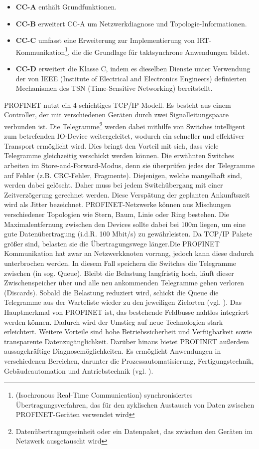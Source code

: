\begin{itemize}
\item \textbf{CC-A} enthält Grundfunktionen.
\item \textbf{CC-B} erweitert CC-A um Netzwerkdiagnose und Topologie-Informationen.
\item \textbf{CC-C} umfasst eine Erweiterung zur Implementierung von IRT-Kommunikation\footnote{(Isochronous Real-Time Communication) synchronisiertes Übertragungsverfahren, das für den zyklischen Austausch von Daten zwischen PROFINET-Geräten verwendet wird}, die die Grundlage für taktsynchrone Anwendungen bildet.
\item \textbf{CC-D} erweitert die Klasse C, indem es dieselben Dienste unter Verwendung der von IEEE (Institute of Electrical and Electronics Engineers) definierten Mechanismen des TSN (Time-Sensitive Networking) bereitstellt.
\end{itemize} PROFINET nutzt ein 4-schichtiges TCP/IP-Modell. 
Es besteht aus einem Controller, der mit verschiedenen Geräten durch zwei Signalleitungspaare verbunden ist. Die Telegramme\footnote{Datenübertragungseinheit oder ein Datenpaket, das zwischen den Geräten im Netzwerk ausgetauscht wird} werden dabei mithilfe von Switches intelligent zum betrefenden IO-Device weitergeleitet, wodurch ein schneller und effektiver Transport ermöglicht wird. Dies bringt den Vorteil mit sich, dass viele Telegramme gleichzeitig verschickt werden können. Die erwähnten Switches arbeiten im Store-and-Forward-Modus, denn sie überprüfen jedes der Telegramme auf Fehler (z.B. CRC-Fehler, Fragmente). Diejenigen, welche mangelhaft sind, werden dabei gelöscht. Daher muss bei jedem Switchübergang mit einer Zeitverzögerung gerechnet werden. Diese Verspätung der geplanten Ankunftszeit wird als Jitter bezeichnet. PROFINET-Netzwerke können aus Mischungen verschiedener Topologien wie Stern, Baum, Linie oder Ring bestehen. Die Maximalentfernung zwischen den Devices sollte dabei bei 100m liegen, um eine gute Datenübertragung (i.d.R. 100 Mbit/s) zu gewährleisten. Da TCP/IP Pakete größer sind, belasten sie die Übertragungswege länger.\clearpage \noindent Die PROFINET Kommunikation hat zwar an Netzwerkknoten vorrang, jedoch kann diese dadurch unterbrochen werden. In diesem Fall speichern die Switches die Telegramme zwischen (in sog. Queue). Bleibt die Belastung langfristig hoch, läuft dieser Zwischenspeicher über und alle neu ankommenden Telegramme gehen verloren (Discards). Sobald die Belastung reduziert wird, schickt die Queue die Telegramme aus der Warteliste wieder zu den jeweiligen Zielorten (vgl. \cite{InduSol2}). Das Hauptmerkmal von PROFINET ist, das bestehende Feldbusse nahtlos integriert werden können. Dadurch wird der Umstieg auf neue Technologien stark erleichtert. Weitere Vorteile sind hohe Betriebssicherheit und Verfügbarkeit sowie transparente Datenzugänglichkeit. Darüber hinaus bietet PROFINET außerdem aussagekräftige Diagnosemöglichkeiten. Es ermöglicht Anwendungen in verschiedenen Bereichen, darunter die Prozessautomatisierung, Fertigungstechnik, Gebäudeautomation und Antriebstechnik (vgl. \cite{fluke}).

